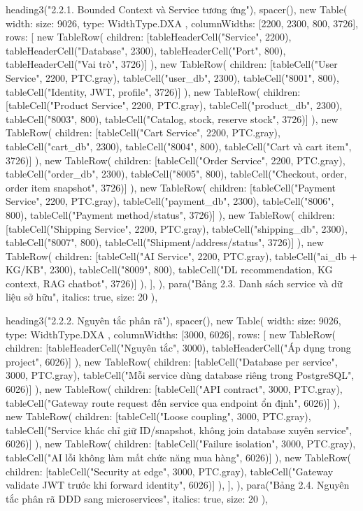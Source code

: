   heading3("2.2.1. Bounded Context và Service tương ứng"),
  spacer(),
  new Table({
    width: { size: 9026, type: WidthType.DXA },
    columnWidths: [2200, 2300, 800, 3726],
    rows: [
      new TableRow({ children: [tableHeaderCell("Service", 2200), tableHeaderCell("Database", 2300), tableHeaderCell("Port", 800), tableHeaderCell("Vai trò", 3726)] }),
      new TableRow({ children: [tableCell("User Service", 2200, PTC.gray), tableCell("user_db", 2300), tableCell("8001", 800), tableCell("Identity, JWT, profile", 3726)] }),
      new TableRow({ children: [tableCell("Product Service", 2200, PTC.gray), tableCell("product_db", 2300), tableCell("8003", 800), tableCell("Catalog, stock, reserve stock", 3726)] }),
      new TableRow({ children: [tableCell("Cart Service", 2200, PTC.gray), tableCell("cart_db", 2300), tableCell("8004", 800), tableCell("Cart và cart item", 3726)] }),
      new TableRow({ children: [tableCell("Order Service", 2200, PTC.gray), tableCell("order_db", 2300), tableCell("8005", 800), tableCell("Checkout, order, order item snapshot", 3726)] }),
      new TableRow({ children: [tableCell("Payment Service", 2200, PTC.gray), tableCell("payment_db", 2300), tableCell("8006", 800), tableCell("Payment method/status", 3726)] }),
      new TableRow({ children: [tableCell("Shipping Service", 2200, PTC.gray), tableCell("shipping_db", 2300), tableCell("8007", 800), tableCell("Shipment/address/status", 3726)] }),
      new TableRow({ children: [tableCell("AI Service", 2200, PTC.gray), tableCell("ai_db + KG/KB", 2300), tableCell("8009", 800), tableCell("DL recommendation, KG context, RAG chatbot", 3726)] }),
    ],
  }),
  para("Bảng 2.3. Danh sách service và dữ liệu sở hữu", { italics: true, size: 20 }),

  heading3("2.2.2. Nguyên tắc phân rã"),
  spacer(),
  new Table({
    width: { size: 9026, type: WidthType.DXA },
    columnWidths: [3000, 6026],
    rows: [
      new TableRow({ children: [tableHeaderCell("Nguyên tắc", 3000), tableHeaderCell("Áp dụng trong project", 6026)] }),
      new TableRow({ children: [tableCell("Database per service", 3000, PTC.gray), tableCell("Mỗi service dùng database riêng trong PostgreSQL", 6026)] }),
      new TableRow({ children: [tableCell("API contract", 3000, PTC.gray), tableCell("Gateway route request đến service qua endpoint ổn định", 6026)] }),
      new TableRow({ children: [tableCell("Loose coupling", 3000, PTC.gray), tableCell("Service khác chỉ giữ ID/snapshot, không join database xuyên service", 6026)] }),
      new TableRow({ children: [tableCell("Failure isolation", 3000, PTC.gray), tableCell("AI lỗi không làm mất chức năng mua hàng", 6026)] }),
      new TableRow({ children: [tableCell("Security at edge", 3000, PTC.gray), tableCell("Gateway validate JWT trước khi forward identity", 6026)] }),
    ],
  }),
  para("Bảng 2.4. Nguyên tắc phân rã DDD sang microservices", { italics: true, size: 20 }),

